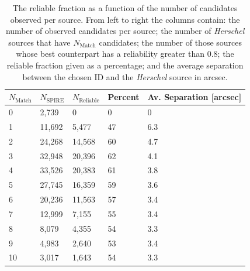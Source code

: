 \begin{table}
    \centering
    \begin{tabular}{p{2cm}|p{2cm}|p{2cm}|p{2cm}|p{4cm}}
        \hline
        \hline
        $N_{\textrm{Match}}$ & $N_{\textrm{SPIRE}}$ & $N_{\textrm{Reliable}}$ & Percent & Av. Separation [arcsec] \\
        \hline
        \hline
        0 & 2,739 & 0 & 0 & 0 \\
        1 & 11,692 & 5,477 & 47 & 6.3 \\
        2 & 24,268 & 14,568 & 60 & 4.7 \\
        3 & 32,948 & 20,396 & 62 & 4.1 \\
        4 & 33,526 & 20,383 & 61 & 3.8 \\
        5 & 27,745 & 16,359 & 59 & 3.6 \\
        6 & 20,236 & 11,563 & 57 & 3.4 \\
        7 & 12,999 & 7,155 & 55 & 3.4 \\
        8 & 8,079 & 4,355 & 54 & 3.3 \\
        9 & 4,983 & 2,640 & 53 & 3.4 \\
        10 & 3,017 & 1,643 & 54 & 3.3 \\
        \hline
    \end{tabular}
    \caption[Reliable fraction of SGP sources as a function of the number of candidates]{The reliable fraction as a function of the number of candidates observed per source. From left to right the columns contain: the number of observed candidates per source; the number of \textit{Herschel} sources that have $N_{\textrm{Match}}$ candidates; the number of those sources whose best counterpart has a reliability greater than $0.8$; the reliable fraction given as a percentage; and the average separation between the chosen ID and the \textit{Herschel} source in arcsec.}
    \label{tab:multiplicity}
\end{table}

